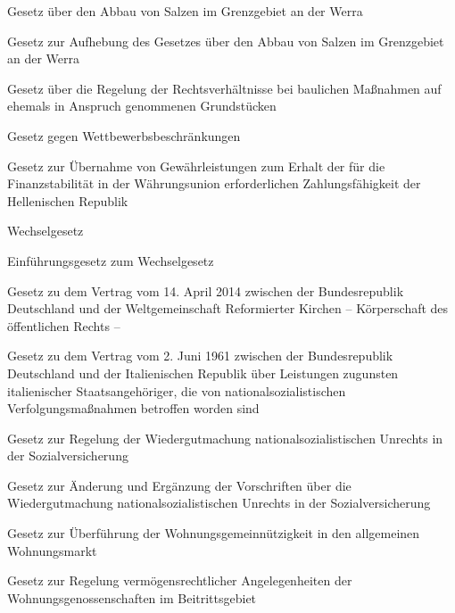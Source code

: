 \item[{WerraSalzG}] Gesetz über den Abbau von Salzen im Grenzgebiet an der Werra

\item[{WerraSalzGAufhG}] Gesetz zur Aufhebung des Gesetzes über den Abbau von Salzen im Grenzgebiet an der Werra

\item[{WertAusglG}] Gesetz über die Regelung der Rechtsverhältnisse bei baulichen Maßnahmen auf ehemals in Anspruch genommenen Grundstücken

\item[{WettbewG}] Gesetz gegen Wettbewerbsbeschränkungen

\item[{WFStG}] Gesetz zur Übernahme von Gewährleistungen zum Erhalt der für die Finanzstabilität in der Währungsunion erforderlichen Zahlungsfähigkeit der Hellenischen Republik

\item[{WG}] Wechselgesetz

\item[{WGEG}] Einführungsgesetz zum Wechselgesetz

\item[{WGemRefKiVtrG}] Gesetz zu dem Vertrag vom 14. April 2014 zwischen der Bundesrepublik Deutschland und der Weltgemeinschaft Reformierter Kirchen – Körperschaft des öffentlichen Rechts –

\item[{WGLeistVtrITAG}] Gesetz zu dem Vertrag vom 2. Juni 1961 zwischen der Bundesrepublik Deutschland und der Italienischen Republik über Leistungen zugunsten italienischer Staatsangehöriger, die von nationalsozialistischen Verfolgungsmaßnahmen betroffen worden sind

\item[{WGSVG}] Gesetz zur Regelung der Wiedergutmachung nationalsozialistischen Unrechts in der Sozialversicherung

\item[{WGSVGÄndG}] Gesetz zur Änderung und Ergänzung der Vorschriften über die Wiedergutmachung nationalsozialistischen Unrechts in der Sozialversicherung

\item[{WGÜbfG}] Gesetz zur Überführung der Wohnungsgemeinnützigkeit in den allgemeinen Wohnungsmarkt

\item[{WGVG}] Gesetz zur Regelung vermögensrechtlicher Angelegenheiten der Wohnungsgenossenschaften im Beitrittsgebiet

